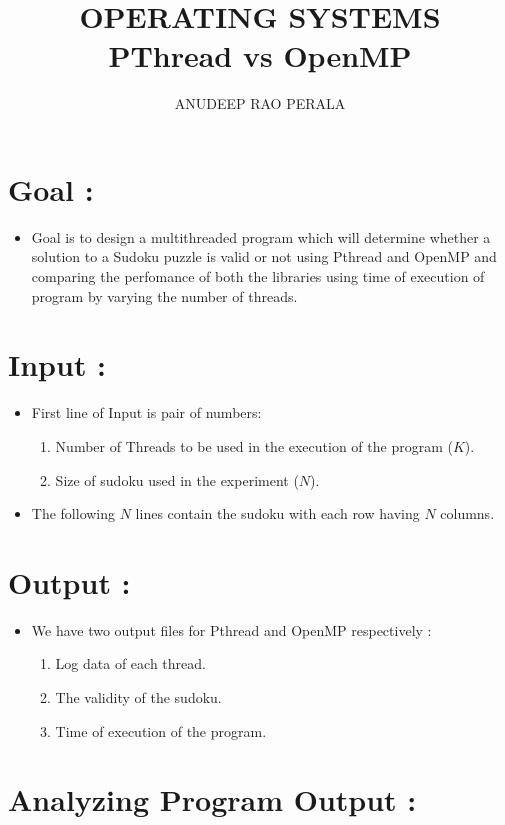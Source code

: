 \documentclass[12pt,a4paper]{article}
\title{OPERATING SYSTEMS\\ PThread vs OpenMP}
\author{ANUDEEP RAO PERALA }
\date{}
\begin{document}
	\maketitle
	
	\tableofcontents
	\newpage
	
	\section{Goal :}
	\begin{itemize}
		\item Goal is to design a multithreaded program which will determine whether a solution to a Sudoku puzzle is valid or not using Pthread and OpenMP and comparing the perfomance of both the libraries using time of execution of program by varying the number of threads.
	\end{itemize}
	\section{Input :}
	\begin{itemize}
		\item First line of Input is pair of numbers:
		\begin{enumerate}
			\item Number of Threads to be used in the execution of the program (\textbf{$K$}).
			\item Size of sudoku used in the experiment (\textbf{$N$}). 
		\end{enumerate}
		\item The following $N$ lines contain the sudoku with each row having $N$ columns. 
	\end{itemize}
	\section{Output :}
	\begin{itemize}
		\item We have two output files for Pthread and OpenMP respectively :
		\begin{enumerate}
			\item Log data of each thread.
			\item The validity of the sudoku.
			\item Time of execution of the program.
		\end{enumerate}
	\end{itemize}
	
	
	\section{ Analyzing Program Output :} 
	
\end{document}
